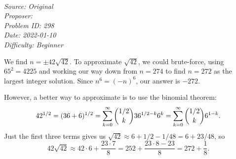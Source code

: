\SSbreak\\
\emph{Source: Original}\\
\emph{Proposer: \Pnjoy}\\
\emph{Problem ID: 298}\\
\emph{Date: 2022-01-10}\\
\emph{Difficulty: Beginner}\\
\SSbreak

\bigskip

\begin{solution}\hfil\medskip
  
    We find $n = \pm 42\sqrt{42}$. To approximate $\sqrt{42}$, we could brute-force, using 
    $65^2 = 4225$ and working our way down from $n = 274$ to find $n = 272$ as the largest 
    integer solution. Since $n^6 = (-n)^6$, our answer is $\boxed{-272}.$ \medskip

    However, a better way to approximate is to use the binomial theorem: 
    $$42^{1/2} = (36 + 6)^{1/2} = \sum_{k = 0}^\infty \dbinom{1/2}{k} 36^{1/2 - k}6^k = \sum_{k = 0}^\infty \dbinom{1/2}{k}6^{1 - k}.$$ 
    Just the first three terms gives us $\sqrt{42} \approx 6 + 1/2 - 1/48 = 6 + 23/48$, so 
    $$42\sqrt{42} \approx 42 \cdot 6 + \dfrac{23 \cdot 7}{8} = 252 + \dfrac{23 \cdot 8 - 23}{8} = 272 + \dfrac{1}{8}.$$
\end{solution}\bigskip
